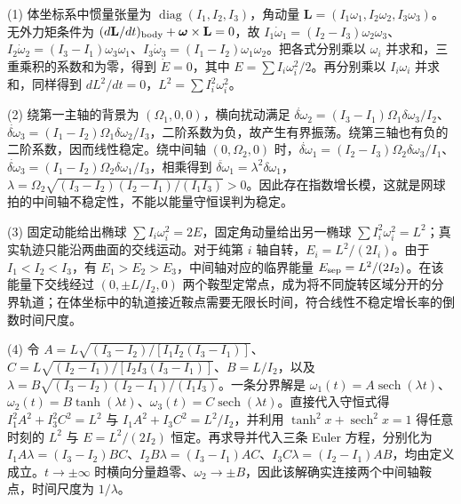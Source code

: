 (1) 体坐标系中惯量张量为 \(\operatorname{diag}(I_1,I_2,I_3)\)，角动量 \(\mathbf L=(I_1\omega_1,I_2\omega_2,I_3\omega_3)\)。无外力矩条件为 \((d\mathbf L/dt)_{\rm body}+\boldsymbol\omega\times\mathbf L=0\)，故 \(I_1\dot\omega_1=(I_2-I_3)\omega_2\omega_3\)、\(I_2\dot\omega_2=(I_3-I_1)\omega_3\omega_1\)、\(I_3\dot\omega_3=(I_1-I_2)\omega_1\omega_2\)。把各式分别乘以 \(\omega_i\) 并求和，三重乘积的系数和为零，得到 \(\dot E=0\)，其中 \(E=\sum I_i\omega_i^2/2\)。再分别乘以 \(I_i\omega_i\) 并求和，同样得到 \(dL^2/dt=0\)，\(L^2=\sum I_i^2\omega_i^2\)。

(2) 绕第一主轴的背景为 \((\Omega_1,0,0)\)，横向扰动满足 \(\dot{\delta\omega}_2=(I_3-I_1)\Omega_1\delta\omega_3/I_2\)、\(\dot{\delta\omega}_3=(I_1-I_2)\Omega_1\delta\omega_2/I_3\)，二阶系数为负，故产生有界振荡。绕第三轴也有负的二阶系数，因而线性稳定。绕中间轴 \((0,\Omega_2,0)\) 时，\(\dot{\delta\omega}_1=(I_2-I_3)\Omega_2\delta\omega_3/I_1\)、\(\dot{\delta\omega}_3=(I_1-I_2)\Omega_2\delta\omega_1/I_3\)，相乘得到 \(\ddot{\delta\omega}_1=\lambda^2\delta\omega_1\)，\(\lambda=\Omega_2\sqrt{(I_3-I_2)(I_2-I_1)/(I_1I_3)}>0\)。因此存在指数增长模，这就是网球拍的中间轴不稳定性，不能以能量守恒误判为稳定。

(3) 固定动能给出椭球 \(\sum I_i\omega_i^2=2E\)，固定角动量给出另一椭球 \(\sum I_i^2\omega_i^2=L^2\)；真实轨迹只能沿两曲面的交线运动。对于纯第 \(i\) 轴自转，\(E_i=L^2/(2I_i)\)。由于 \(I_1<I_2<I_3\)，有 \(E_1>E_2>E_3\)，中间轴对应的临界能量 \(E_{\rm sep}=L^2/(2I_2)\)。在该能量下交线经过 \((0,\pm L/I_2,0)\) 两个鞍型定常点，成为将不同旋转区域分开的分界轨道；在体坐标中的轨道接近鞍点需要无限长时间，符合线性不稳定增长率的倒数时间尺度。

(4) 令 \(A=L\sqrt{(I_3-I_2)/[I_1I_2(I_3-I_1)]}\)、\(C=L\sqrt{(I_2-I_1)/[I_2I_3(I_3-I_1)]}\)、\(B=L/I_2\)，以及 \(\lambda=B\sqrt{(I_3-I_2)(I_2-I_1)/(I_1I_3)}\)。一条分界解是 \(\omega_1(t)=A\operatorname{sech}(\lambda t)\)、\(\omega_2(t)=B\tanh(\lambda t)\)、\(\omega_3(t)=C\operatorname{sech}(\lambda t)\)。直接代入守恒式得 \(I_1^2A^2+I_3^2C^2=L^2\) 与 \(I_1A^2+I_3C^2=L^2/I_2\)，并利用 \(\tanh^2x+\operatorname{sech}^2x=1\) 得任意时刻的 \(L^2\) 与 \(E=L^2/(2I_2)\) 恒定。再求导并代入三条 Euler 方程，分别化为 \(I_1A\lambda=(I_3-I_2)BC\)、\(I_2B\lambda=(I_3-I_1)AC\)、\(I_3C\lambda=(I_2-I_1)AB\)，均由定义成立。\(t\to\pm\infty\) 时横向分量趋零、\(\omega_2\to\pm B\)，因此该解确实连接两个中间轴鞍点，时间尺度为 \(1/\lambda\)。
